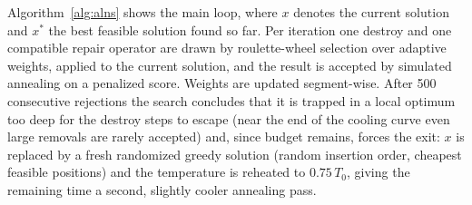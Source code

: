 \documentclass[10pt, a4paper]{article}
\begin{document}
Algorithm~\ref{alg:alns} shows the main loop, where $x$ denotes the current
solution and $x^{*}$ the best feasible solution found so far. Per iteration
one destroy and one compatible repair operator are drawn by roulette-wheel
selection over adaptive weights, applied to the current solution, and the
result is accepted by simulated annealing on a penalized score. Weights are
updated segment-wise. After 500 consecutive rejections the search concludes
that it is trapped in a local optimum too deep for the destroy steps to
escape (near the end of the cooling curve even large removals are rarely
accepted) and, since budget remains, forces the exit: $x$ is replaced by a
fresh randomized greedy solution (random insertion order, cheapest feasible
positions) and the temperature is reheated to $0.75\,T_0$, giving the
remaining time a second, slightly cooler annealing pass.
\end{document}
